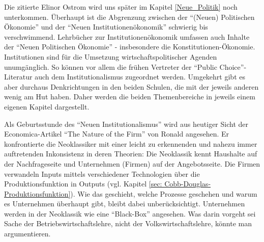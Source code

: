 Die zitierte Elinor Ostrom wird uns später im Kapitel \ref{Neue_Politik} noch unterkommen. Überhaupt ist die Abgrenzung zwischen der "`(Neuen) Politischen Ökonomie"' und der "`Neuen Institutionenökonomik"' schwierig bis verschwimmend. Lehrbücher zur Institutionenökonomik \parencite{Erlei2016, Voigt2009} umfassen auch Inhalte der "`Neuen Politischen Ökonomie"' - insbesondere die Konstitutionen-Ökonomie. Institutionen sind für die Umsetzung wirtschaftspolitischer Agenden unumgänglich. So können vor allem die frühen Vertreter der "`Public Choice"'-Literatur auch dem Institutionalismus zugeordnet werden. Umgekehrt gibt es aber durchaus Denkrichtungen in den beiden Schulen, die mit der jeweils anderen wenig am Hut haben. Daher werden die beiden Themenbereiche in jeweils einem eigenen Kapitel dargestellt.

Als Geburtsstunde des "`Neuen Institutionalismus"' wird aus heutiger Sicht der Economica-Artikel "`The Nature of the Firm"' von Ronald \textcite{Coase1937} angesehen. Er konfrontierte die Neoklassiker mit einer leicht zu erkennenden und nahezu immer auftretenden Inkonsistenz in deren Theorien: Die Neoklassik kennt Haushalte auf der Nachfrageseite und Unternehmen (Firmen) auf der Angebotsseite. Die Firmen verwandeln Inputs mittels verschiedener Technologien über die Produktionsfunktion in Outputs (vgl. Kapitel \ref{sec: Cobb-Douglas-Produktionsfunktion}). Wie das geschieht, welche Prozesse geschehen und warum es Unternehmen überhaupt gibt, bleibt dabei unberücksichtigt. Unternehmen werden in der Neoklassik wie eine "`Black-Box"' angesehen. Was darin vorgeht sei Sache der Betriebswirtschaftslehre, nicht der Volkswirtschaftslehre, könnte man argumentieren.

